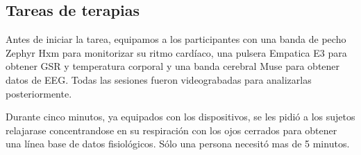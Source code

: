 \subsection{Tareas de terapias}\label{secc:therapytasks}
Antes de iniciar la tarea, equipamos a los participantes con una banda de pecho Zephyr Hxm para monitorizar su ritmo card\'iaco, una pulsera Empatica E3 para obtener GSR y temperatura corporal y una banda cerebral Muse para obtener datos de EEG. Todas las sesiones fueron videograbadas para analizarlas posteriormente.

Durante cinco minutos, ya equipados con los dispositivos, se les pidi\'o a los sujetos relajarase concentrandose en su respiraci\'on con los ojos cerrados para obtener una l\'inea base de datos fisiol\'ogicos. S\'olo una persona necesit\'o mas de 5 minutos.

